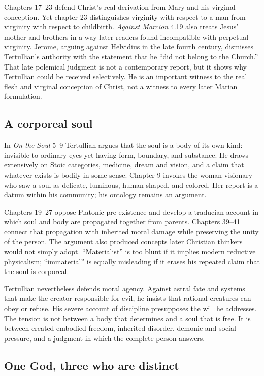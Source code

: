 Chapters 17--23 defend Christ's real derivation from Mary and his virginal
conception. Yet chapter 23 distinguishes virginity with respect to a man from
virginity with respect to childbirth. \emph{Against Marcion} 4.19 also treats
Jesus' mother and brothers in a way later readers found incompatible with
perpetual virginity. Jerome, arguing against Helvidius in the late fourth
century, dismisses Tertullian's authority with the statement that he ``did not
belong to the Church.'' That late polemical judgment is not a contemporary
report, but it shows why Tertullian could be received selectively. He is an
important witness to the real flesh and virginal conception of Christ, not a
witness to every later Marian formulation.

\subsection{A corporeal soul}

In \emph{On the Soul} 5--9 Tertullian argues that the soul is a body of its own
kind: invisible to ordinary eyes yet having form, boundary, and substance. He
draws extensively on Stoic categories, medicine, dream and vision, and a claim
that whatever exists is bodily in some sense. Chapter 9 invokes the woman
visionary who saw a soul as delicate, luminous, human-shaped, and colored. Her
report is a datum within his community; his ontology remains an argument.

Chapters 19--27 oppose Platonic pre-existence and develop a traducian account
in which soul and body are propagated together from parents. Chapters 39--41
connect that propagation with inherited moral damage while preserving the
unity of the person. The argument also produced concepts later Christian
thinkers would not simply adopt. ``Materialist'' is too blunt if it implies
modern reductive physicalism; ``immaterial'' is equally misleading if it erases
his repeated claim that the soul is corporeal.

Tertullian nevertheless defends moral agency. Against astral fate and systems
that make the creator responsible for evil, he insists that rational creatures
can obey or refuse. His severe account of discipline presupposes the will he
addresses. The tension is not between a body that determines and a soul that is
free. It is between created embodied freedom, inherited disorder, demonic and
social pressure, and a judgment in which the complete person answers.

\subsection{One God, three who are distinct}

